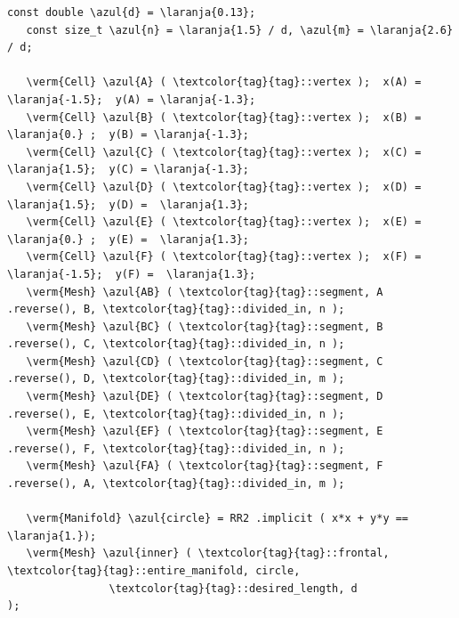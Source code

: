 \begin{Verbatim}[commandchars=\\\{\},formatcom=\small\tt,frame=single,
   label=parag-\ref{\numb section 7.\numb parag 22}.cpp,rulecolor=\color{moldura},
   baselinestretch=0.94,framesep=2mm                                             ]
   const double \azul{d} = \laranja{0.13};
   const size_t \azul{n} = \laranja{1.5} / d, \azul{m} = \laranja{2.6} / d;

   \verm{Cell} \azul{A} ( \textcolor{tag}{tag}::vertex );  x(A) = \laranja{-1.5};  y(A) = \laranja{-1.3};
   \verm{Cell} \azul{B} ( \textcolor{tag}{tag}::vertex );  x(B) =  \laranja{0.} ;  y(B) = \laranja{-1.3};
   \verm{Cell} \azul{C} ( \textcolor{tag}{tag}::vertex );  x(C) =  \laranja{1.5};  y(C) = \laranja{-1.3};
   \verm{Cell} \azul{D} ( \textcolor{tag}{tag}::vertex );  x(D) =  \laranja{1.5};  y(D) =  \laranja{1.3};
   \verm{Cell} \azul{E} ( \textcolor{tag}{tag}::vertex );  x(E) =  \laranja{0.} ;  y(E) =  \laranja{1.3};
   \verm{Cell} \azul{F} ( \textcolor{tag}{tag}::vertex );  x(F) = \laranja{-1.5};  y(F) =  \laranja{1.3};
   \verm{Mesh} \azul{AB} ( \textcolor{tag}{tag}::segment, A .reverse(), B, \textcolor{tag}{tag}::divided_in, n );
   \verm{Mesh} \azul{BC} ( \textcolor{tag}{tag}::segment, B .reverse(), C, \textcolor{tag}{tag}::divided_in, n );
   \verm{Mesh} \azul{CD} ( \textcolor{tag}{tag}::segment, C .reverse(), D, \textcolor{tag}{tag}::divided_in, m );
   \verm{Mesh} \azul{DE} ( \textcolor{tag}{tag}::segment, D .reverse(), E, \textcolor{tag}{tag}::divided_in, n );
   \verm{Mesh} \azul{EF} ( \textcolor{tag}{tag}::segment, E .reverse(), F, \textcolor{tag}{tag}::divided_in, n );
   \verm{Mesh} \azul{FA} ( \textcolor{tag}{tag}::segment, F .reverse(), A, \textcolor{tag}{tag}::divided_in, m );

   \verm{Manifold} \azul{circle} = RR2 .implicit ( x*x + y*y == \laranja{1.});
   \verm{Mesh} \azul{inner} ( \textcolor{tag}{tag}::frontal, \textcolor{tag}{tag}::entire_manifold, circle,
                \textcolor{tag}{tag}::desired_length, d                     );
\end{Verbatim}

